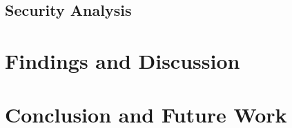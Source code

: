 \documentclass{article}
\begin{document}
\subsection{Security Analysis}
\section{Findings and Discussion}
\label{sec:discussion}
\section{Conclusion and Future Work}
\label{sec:conclusion}



\end{document}

